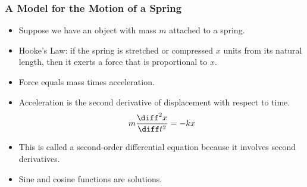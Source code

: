 \begin{frame}
\frametitle{A Model for the Motion of a Spring}
\begin{itemize}
\item  Suppose we have an object with mass $m$ attached to a spring.
\item  Hooke's Law: if the spring is stretched or compressed $x$ units from its natural length, then it exerts a force that is proportional to $x$.
\item  Force equals mass times acceleration.
\item  Acceleration is the second derivative of displacement with respect to time.
\[
m\frac{\diff^2 x}{\diff t^2} = -kx
\]
\item<2->  This is called a second-order differential equation because it involves second derivatives.
\item<3->  Sine and cosine functions are solutions.
\end{itemize}
\end{frame}
